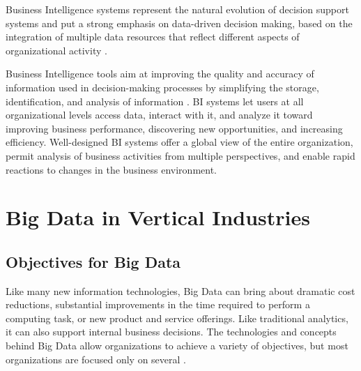 \documentclass[runningheads]{llncs}
\begin{document}
Business Intelligence systems represent the natural evolution of decision support systems and put a strong emphasis on data-driven decision making, based on the integration of multiple data resources that reflect different aspects of organizational activity \cite{YOGEV}.

Business Intelligence tools aim at improving the quality and accuracy of information used in decision-making processes by simplifying the storage, identification, and analysis of information \cite{NEGASH}. BI systems let users at all organizational levels access data, interact with it, and analyze it toward improving business performance, discovering new opportunities, and increasing efficiency. Well-designed BI systems offer a global view of the entire organization, permit analysis of business activities from multiple perspectives, and enable rapid reactions to changes in the business environment.

\section{Big Data in Vertical Industries}
\subsection{Objectives for Big Data}
Like many new information technologies, Big Data can bring about dramatic cost reductions, substantial improvements in the time required to perform a computing task, or new product and service offerings. Like traditional analytics, it can also support internal business decisions. The technologies and concepts behind Big Data allow organizations to achieve a variety of objectives, but most organizations are focused only on several \cite{DAVENPORT}.
\end{document}
